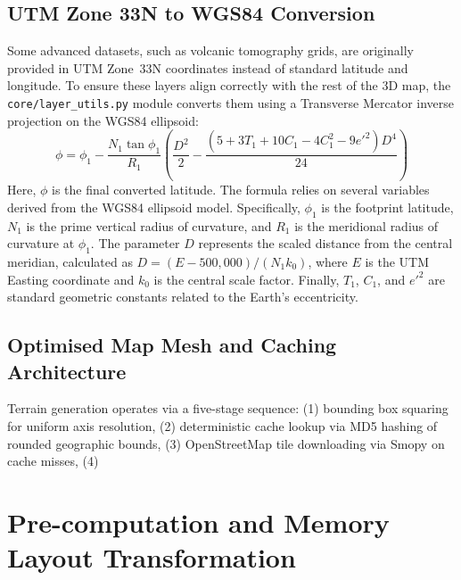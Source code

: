 \subsection{UTM Zone 33N to WGS84 Conversion}

Some advanced datasets, such as volcanic tomography grids, are originally provided in UTM Zone~33N coordinates instead of standard latitude and longitude. To ensure these layers align correctly with the rest of the 3D map, the \texttt{core/layer\_utils.py} module converts them using a Transverse Mercator inverse projection on the WGS84 ellipsoid:
\begin{equation}
    \phi = \phi_1 - \frac{N_1 \tan\phi_1}{R_1}\left(\frac{D^2}{2} - \frac{(5 + 3T_1 + 10C_1 - 4C_1^2 - 9e'^2)D^4}{24}\right)
\end{equation}
Here, $\phi$ is the final converted latitude. The formula relies on several variables derived from the WGS84 ellipsoid model. Specifically, $\phi_1$ is the footprint latitude, $N_1$ is the prime vertical radius of curvature, and $R_1$ is the meridional radius of curvature at $\phi_1$. The parameter $D$ represents the scaled distance from the central meridian, calculated as $D = (E - 500{,}000) / (N_1 k_0)$, where $E$ is the UTM Easting coordinate and $k_0$ is the central scale factor. Finally, $T_1$, $C_1$, and $e'^2$ are standard geometric constants related to the Earth's eccentricity.

\subsection{Optimised Map Mesh and Caching Architecture}

Terrain generation operates via a five-stage sequence: (1) bounding box squaring for uniform axis resolution, (2) deterministic cache lookup via MD5 hashing of rounded geographic bounds, (3) OpenStreetMap tile downloading via Smopy \cite{smopy} on cache misses, (4) 

\section{Pre-computation and Memory Layout Transformation}
\label{sec:precomputation}
\label{sec:strip-data}
\label{sec:binary-streaming}

